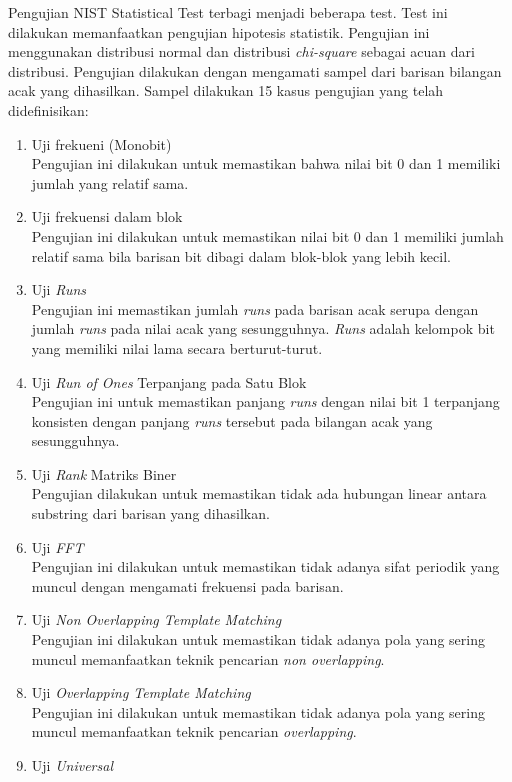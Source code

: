 Pengujian NIST Statistical Test terbagi menjadi beberapa test. Test ini dilakukan memanfaatkan pengujian hipotesis statistik. Pengujian ini menggunakan distribusi normal dan distribusi \emph{chi-square} sebagai acuan dari distribusi. Pengujian dilakukan dengan mengamati sampel dari barisan bilangan acak yang dihasilkan. Sampel dilakukan 15 kasus pengujian yang telah didefinisikan:

\begin{enumerate}
  \item Uji frekueni (Monobit) \\
  Pengujian ini dilakukan untuk memastikan bahwa nilai bit 0 dan 1 memiliki jumlah yang relatif sama.
  \item Uji frekuensi dalam blok \\
  Pengujian ini dilakukan untuk memastikan nilai bit 0 dan 1 memiliki jumlah relatif sama bila barisan bit dibagi dalam blok-blok yang lebih kecil.
  \item Uji \emph{Runs} \\
  Pengujian ini memastikan jumlah \emph{runs} pada barisan acak serupa dengan jumlah \emph{runs} pada nilai acak yang sesungguhnya. \emph{Runs} adalah kelompok bit yang memiliki nilai lama secara berturut-turut.
  \item Uji \emph{Run of Ones} Terpanjang pada Satu Blok \\
  Pengujian ini untuk memastikan panjang \emph{runs} dengan nilai bit 1 terpanjang konsisten dengan panjang \emph{runs} tersebut pada bilangan acak yang sesungguhnya.
  \item Uji \emph{Rank} Matriks Biner \\
  Pengujian dilakukan untuk memastikan tidak ada hubungan linear antara substring dari barisan yang dihasilkan.
  \item Uji \emph{FFT} \\
  Pengujian ini dilakukan untuk memastikan tidak adanya sifat periodik yang muncul dengan mengamati frekuensi pada barisan.
  \item Uji \emph{Non Overlapping Template Matching} \\
  Pengujian ini dilakukan untuk memastikan tidak adanya pola yang sering muncul memanfaatkan teknik pencarian \emph{non overlapping}.
  \item Uji \emph{Overlapping Template Matching} \\
  Pengujian ini dilakukan untuk memastikan tidak adanya pola yang sering muncul memanfaatkan teknik pencarian \emph{overlapping}.
  \item Uji \emph{Universal} \\

\end{enumerate}
